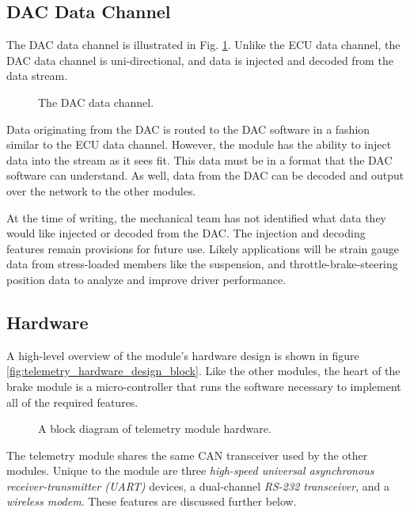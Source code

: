 \subsection{DAC Data Channel}

The DAC data channel is illustrated in Fig. \ref{fig:dac_data_channel}. Unlike the ECU data channel, the DAC data channel is uni-directional, and data is injected and decoded from the data stream.

\begin{figure}[H]
	\centering
	
	\caption{The DAC data channel.}
	\label{fig:dac_data_channel}
\end{figure}

Data originating from the DAC is routed to the DAC software in a fashion similar to the ECU data channel. However, the module has the ability to inject data into the stream as it sees fit. This data must be in a format that the DAC software can understand. As well, data from the DAC can be decoded and output over the network to the other modules. 

At the time of writing, the mechanical team has not identified what data they would like injected or decoded from the DAC. The injection and decoding features remain provisions for future use. Likely applications will be strain gauge data from stress-loaded members like the suspension, and throttle-brake-steering position data to analyze and improve driver performance.

\subsection{Hardware}

A high-level overview of the module's hardware design is shown in figure \ref{fig:telemetry_hardware_design_block}. Like the other modules, the heart of the brake module is a micro-controller that runs the software necessary to implement all of the required features. 

\begin{figure}[H]
\centering

\caption{A block diagram of telemetry module hardware.}
\label{fig:telemetry_hardware_block}
\end{figure}


The telemetry module shares the same CAN transceiver used by the other modules. Unique to the module are three \emph{high-speed universal asynchronous receiver-transmitter (UART)} devices, a dual-channel \emph{RS-232 transceiver}, and a \emph{wireless modem}. These features are discussed further below.

